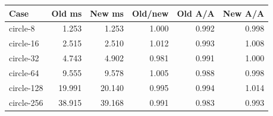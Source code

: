 \begin{center}\small
\begin{tabular}{lrrrrr}
\toprule
Case & Old ms & New ms & Old/new & Old A/A & New A/A \\
\midrule
circle-8 & 1.253 & 1.253 & 1.000 & 0.992 & 0.998 \\
circle-16 & 2.515 & 2.510 & 1.012 & 0.993 & 1.008 \\
circle-32 & 4.743 & 4.902 & 0.981 & 0.991 & 1.000 \\
circle-64 & 9.555 & 9.578 & 1.005 & 0.988 & 0.998 \\
circle-128 & 19.991 & 20.140 & 0.995 & 0.994 & 1.014 \\
circle-256 & 38.915 & 39.168 & 0.991 & 0.983 & 0.993 \\
\bottomrule
\end{tabular}
\end{center}
